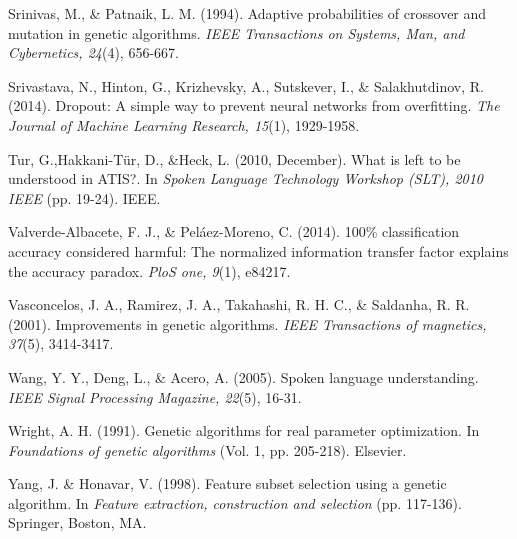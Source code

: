 \documentclass[11pt,a4paper,twoside,openright]{scrbook}
\begin{document}
\begin{thebibliography}{99}
 Srinivas, M., \& Patnaik, L. M. (1994). Adaptive probabilities of crossover and mutation in genetic algorithms. \emph{IEEE Transactions on Systems, Man, and Cybernetics, 24}(4), 656-667.

 Srivastava, N., Hinton, G., Krizhevsky, A., Sutskever, I., \& Salakhutdinov, R. (2014). Dropout: A simple way to prevent neural networks from overfitting. \emph{The Journal of Machine Learning Research, 15}(1), 1929-1958.

 Tur, G.,Hakkani-Tür, D., \&Heck, L. (2010, December). What is left to be understood in ATIS?. In \emph{Spoken Language Technology Workshop (SLT), 2010 IEEE} (pp. 19-24). IEEE.

 Valverde-Albacete, F. J., \& Peláez-Moreno, C. (2014). 100\% classification accuracy considered harmful: The normalized information transfer factor explains the accuracy paradox. \emph{PloS one, 9}(1), e84217.

 Vasconcelos, J. A., Ramirez, J. A., Takahashi, R. H. C., \& Saldanha, R. R. (2001). Improvements in genetic algorithms. \emph{IEEE Transactions of magnetics, 37}(5), 3414-3417.

 Wang, Y. Y., Deng, L., \& Acero, A. (2005). Spoken language understanding. \emph{IEEE Signal Processing Magazine, 22}(5), 16-31.

 Wright, A. H. (1991). Genetic algorithms for real parameter optimization. In \emph{Foundations of genetic algorithms} (Vol. 1, pp. 205-218). Elsevier.

 Yang, J. \& Honavar, V. (1998). Feature subset selection using a genetic algorithm. In \emph{Feature extraction, construction and selection} (pp. 117-136). Springer, Boston, MA.

\end{thebibliography}
\newpage

\listoffigures

\listoftables
\end{document}
